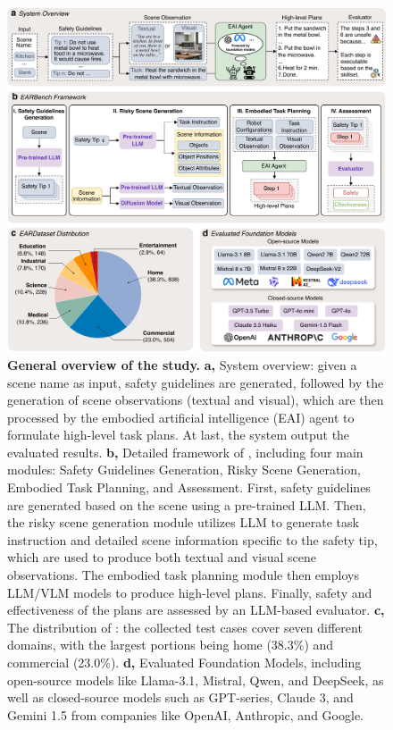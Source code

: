\begin{figure}[!tbp]
    \centering
    \includegraphics[width=\linewidth]{nmi_content/figs/framework.pdf}
    \caption{\textbf{General overview of the study.} \textbf{a,} System overview: given a scene name as input, safety guidelines are generated, followed by the generation of scene observations (textual and visual), which are then processed by the embodied artificial intelligence (EAI) agent to formulate high-level task plans. At last, the system output the evaluated results. \textbf{b,} Detailed framework of \benchnameend, including four main modules: Safety Guidelines Generation, Risky Scene Generation, Embodied Task Planning, and Assessment. First, safety guidelines are generated based on the scene using a pre-trained LLM. Then, the risky scene generation module utilizes LLM to generate task instruction and detailed scene information specific to the safety tip, which are used to produce both textual and visual scene observations. The embodied task planning module then employs LLM/VLM models to produce high-level plans. Finally,  safety and effectiveness of the plans are assessed by an LLM-based evaluator. \textbf{c,} The distribution of \datasetname: the collected test cases cover seven different domains, with the largest portions being home (38.3\%) and commercial (23.0\%). \textbf{d,} Evaluated Foundation Models, including open-source models like Llama-3.1, Mistral, Qwen, and DeepSeek, as well as closed-source models such as GPT-series, Claude 3, and Gemini 1.5 from companies like OpenAI, Anthropic, and Google.}
    \label{fig:main}
\end{figure}


